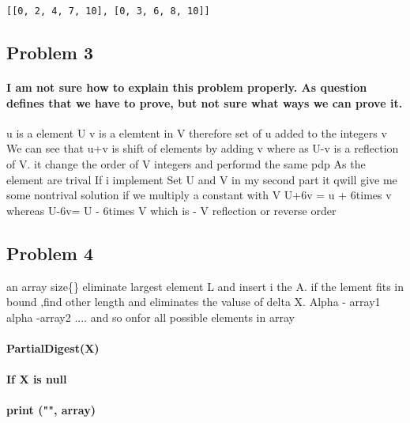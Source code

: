 \documentclass[11pt]{article}
\begin{document}
    \begin{Verbatim}[commandchars=\\\{\}]
[[0, 2, 4, 7, 10], [0, 3, 6, 8, 10]]

    \end{Verbatim}

    \subsection{Problem 3}\label{problem-3}

    \paragraph{I am not sure how to explain this problem properly. As
question defines that we have to prove, but not sure what ways we can
prove
it.}\label{i-am-not-sure-how-to-explain-this-problem-properly.-as-question-defines-that-we-have-to-prove-but-not-sure-what-ways-we-can-prove-it.}

u is a element U v is a elemtent in V therefore set of u added to the
integers v We can see that u+v is shift of elements by adding v where as
U-v is a reflection of V. it change the order of V integers and performd
the same pdp As the element are trival If i implement Set U and V in my
second part it qwill give me some nontrival solution if we multiply a
constant with V U+6v = u + 6times v whereas U-6v= U - 6times V which is
- V reflection or reverse order

    \subsection{Problem 4}\label{problem-4}

    an array size\{\} eliminate largest element L and insert i the A. if the
lement fits in bound ,find other length and eliminates the valuse of
delta X. Alpha - array1 alpha -array2 .... and so onfor all possible
elements in array

\paragraph{PartialDigest(X)}\label{partialdigestx}

\paragraph{If X is null}\label{if-x-is-null}

\paragraph{print ("", array)}\label{print-array}
\end{document}
